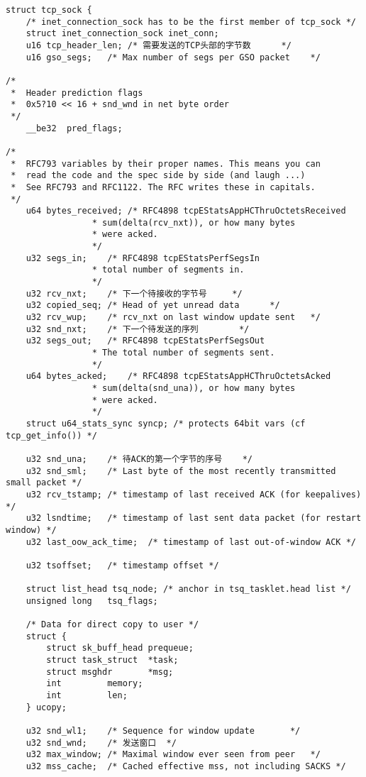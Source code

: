 \begin{verbatim}
struct tcp_sock {
    /* inet_connection_sock has to be the first member of tcp_sock */
    struct inet_connection_sock inet_conn;
    u16 tcp_header_len; /* 需要发送的TCP头部的字节数      */
    u16 gso_segs;   /* Max number of segs per GSO packet    */

/*
 *  Header prediction flags
 *  0x5?10 << 16 + snd_wnd in net byte order
 */
    __be32  pred_flags;

/*
 *  RFC793 variables by their proper names. This means you can
 *  read the code and the spec side by side (and laugh ...)
 *  See RFC793 and RFC1122. The RFC writes these in capitals.
 */
    u64 bytes_received; /* RFC4898 tcpEStatsAppHCThruOctetsReceived
                 * sum(delta(rcv_nxt)), or how many bytes
                 * were acked.
                 */
    u32 segs_in;    /* RFC4898 tcpEStatsPerfSegsIn
                 * total number of segments in.
                 */
    u32 rcv_nxt;    /* 下一个待接收的字节号     */
    u32 copied_seq; /* Head of yet unread data      */
    u32 rcv_wup;    /* rcv_nxt on last window update sent   */
    u32 snd_nxt;    /* 下一个待发送的序列        */
    u32 segs_out;   /* RFC4898 tcpEStatsPerfSegsOut
                 * The total number of segments sent.
                 */
    u64 bytes_acked;    /* RFC4898 tcpEStatsAppHCThruOctetsAcked
                 * sum(delta(snd_una)), or how many bytes
                 * were acked.
                 */
    struct u64_stats_sync syncp; /* protects 64bit vars (cf tcp_get_info()) */

    u32 snd_una;    /* 待ACK的第一个字节的序号    */
    u32 snd_sml;    /* Last byte of the most recently transmitted small packet */
    u32 rcv_tstamp; /* timestamp of last received ACK (for keepalives) */
    u32 lsndtime;   /* timestamp of last sent data packet (for restart window) */
    u32 last_oow_ack_time;  /* timestamp of last out-of-window ACK */

    u32 tsoffset;   /* timestamp offset */

    struct list_head tsq_node; /* anchor in tsq_tasklet.head list */
    unsigned long   tsq_flags;

    /* Data for direct copy to user */
    struct {
        struct sk_buff_head prequeue;
        struct task_struct  *task;
        struct msghdr       *msg;
        int         memory;
        int         len;
    } ucopy;

    u32 snd_wl1;    /* Sequence for window update       */
    u32 snd_wnd;    /* 发送窗口  */
    u32 max_window; /* Maximal window ever seen from peer   */
    u32 mss_cache;  /* Cached effective mss, not including SACKS */


\end{verbatim}
